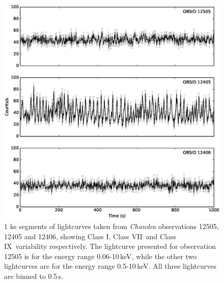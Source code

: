 \begin{figure}
    \includegraphics[width=0.8\columnwidth, trim = 0.6cm 0 3.9cm 0]{images/Chandra.eps}
    \captionsetup{singlelinecheck=off}
    \caption[\textit{Chandra} lightcurves showing examples of Class I, VII and IX variability.]{1 ks segments of lightcurves taken from \indexchandra\textit{Chandra} observations 12505, 12405 and 12406, showing Class I\indexi, Class VII\indexvii\ and Class IX\indexix\ variability respectively.  The lightcurve presented for observation 12505 is for the energy range 0.06-10\,keV, while the other two lightcurves are for the energy range 0.5-10\,keV.  All three lightcurves are binned to 0.5\,s.}
   \label{fig:Cha_lc}
\end{figure}

